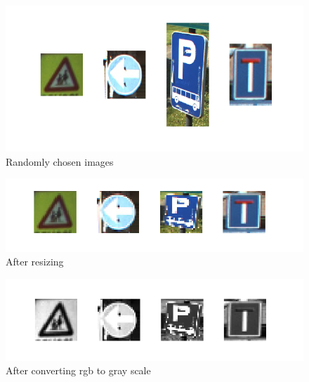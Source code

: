\documentclass[]{report}
\begin{document}
\begin{figure}[H]
\centerline{\includegraphics[scale=0.9]{random_signs}}
\caption{Randomly chosen images}
\end{figure}
\begin{figure}[H]
\centerline{\includegraphics[scale=0.9]{after_resizing}}
\caption{After resizing}
\end{figure}
\begin{figure}[H]
\centerline{\includegraphics[scale=0.9]{after_gray}}
\caption{After converting rgb to gray scale}
\end{figure}
\end{document}

